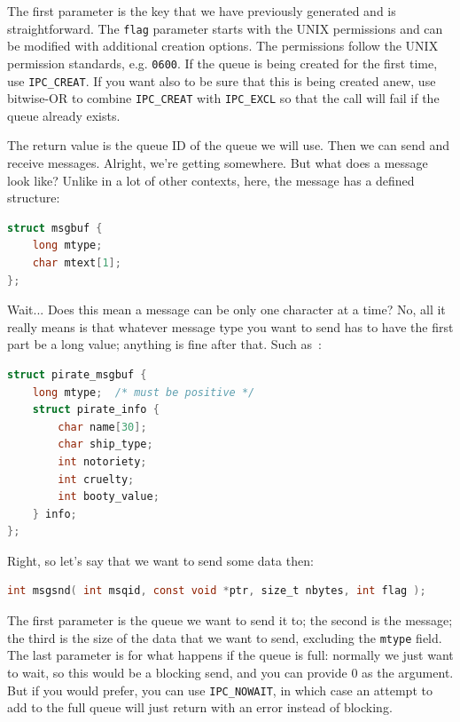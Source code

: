 The first parameter is the key that we have previously generated and is straightforward. The \texttt{flag} parameter starts with the UNIX permissions and can be modified with additional creation options. The  permissions follow the UNIX permission standards, e.g. \texttt{0600}. If the queue is being created for the first time, use \texttt{IPC\_CREAT}. If you want also to be sure that this is being created anew, use bitwise-OR to combine \texttt{IPC\_CREAT} with \texttt{IPC\_EXCL} so that the call will fail if the queue already exists.

The return value is the queue ID of the queue we will use. Then we can send and receive messages. Alright, we're getting somewhere. But what does a message look like? Unlike in a lot of other contexts, here, the message has a defined structure: 

\begin{lstlisting}[language=C]
struct msgbuf {
    long mtype;
    char mtext[1];
};
\end{lstlisting}

Wait... Does this mean a message can be only one character at a time? No, all it really means is that whatever message type you want to send has to have the first part be a long value; anything is fine after that. Such as~\cite{bmq}:

\begin{lstlisting}[language=C]
struct pirate_msgbuf {
    long mtype;  /* must be positive */
    struct pirate_info {
        char name[30];
        char ship_type;
        int notoriety;
        int cruelty;
        int booty_value;
    } info;
};
\end{lstlisting}

Right, so let's say that we want to send some data then:

\begin{lstlisting}[language=C]
int msgsnd( int msqid, const void *ptr, size_t nbytes, int flag );
\end{lstlisting}

The first parameter is the queue we want to send it to; the second is the message; the third is the size of the data that we want to send, excluding the \texttt{mtype} field. The last parameter is for what happens if the queue is full: normally we just want to wait, so this would be a blocking send, and you can provide 0 as the argument. But if you would prefer, you can use \texttt{IPC\_NOWAIT}, in which case an attempt to add to the full queue will just return with an error instead of blocking.

